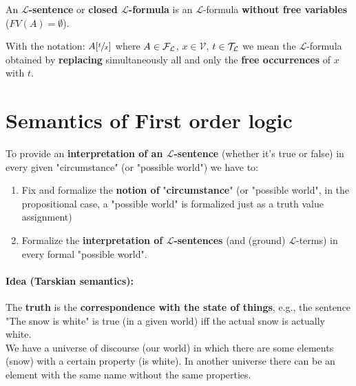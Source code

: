 \begin{definition}
	An \textbf{$\mathcal{L}$-sentence} or \textbf{closed $\mathcal{L}$-formula} is an $\mathcal{L}$-formula \textbf{without free variables} ($FV(A) = \emptyset$).\\
\end{definition}

With the notation: $A [\sfrac{t}{x}]$ where $A \in \mathcal{F}_\mathcal{L}$, $x \in \mathcal{V}$, $t \in \mathcal{T}_\mathcal{L}$ we mean the $\mathcal{L}$-formula obtained by \textbf{replacing} simultaneously all and only the \textbf{free occurrences} of $x$ with $t$.\\

\newpage

\section{Semantics of First order logic}

To provide an \textbf{interpretation of an $\mathcal{L}$-sentence} (whether it's true or false) in every given "circumstance" (or "possible world") we have to: 
\begin{enumerate}
	\item Fix and formalize the \textbf{notion of} "\textbf{circumstance}" (or "possible world", in the propositional case, a "possible world" is formalized just as a truth value assignment)
	\item Formalize the \textbf{interpretation of $\mathcal{L}$-sentences} (and (ground) $\mathcal{L}$-terms) in every formal "possible world".
\end{enumerate}

\paragraph{Idea (Tarskian semantics):} The \textbf{truth} is the \textbf{correspondence with the state of things}, e.g., the sentence "The snow is white" is true (in a given world) iff the actual snow is actually white.\\
We have a universe of discourse (our world) in which there are some elements (snow) with a certain property (is white). In another universe there can be an element with the same name without the same properties.\\

